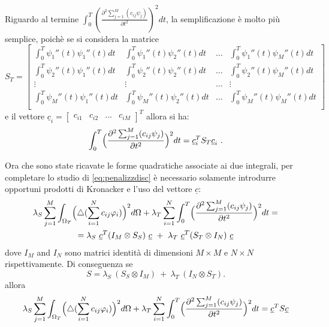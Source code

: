 \documentclass[a4paper,11pt,twoside,openright]{book}							%
\begin{document}
Riguardo al termine $\int_0^T (\frac{\partial^2 \sum_{j=1}^M(c_{ij}\psi_j) }{\partial t ^2} )^2 dt$, la semplificazione è molto più semplice, poichè se si considera la matrice
 $$ S_T = \begin{bmatrix}
\int_0^T \psi_1''(t) \psi_1''(t) dt  & \int_0^T \psi_1''(t) \psi_2''(t) dt & \hdots & \int_0^T \psi_1''(t) \psi_M''(t) dt  \\
\int_0^T \psi_2''(t) \psi_1''(t) dt  & \int_0^T \psi_2''(t) \psi_2''(t) dt & \hdots & \int_0^T \psi_2''(t) \psi_M''(t) dt  \\
\vdots & \vdots & \hdots & \vdots \\
\int_0^T \psi_M''(t) \psi_1''(t) dt  & \int_0^T \psi_M''(t) \psi_2''(t) dt & \hdots & \int_0^T \psi_M''(t) \psi_M''(t) dt  \\
\end{bmatrix} $$
e il vettore $
\underline c_i =
\begin{bmatrix}
c_{i1} & c_{i2} & \hdots & c_{iM}
\end{bmatrix}^T$ allora si ha:
$$
\int_0^T \Bigl( \frac{\partial^2 \sum_{j=1}^M(c_{ij}\psi_j) }{\partial t ^2} \Bigr)^2 dt =\underline c_i^T  S_T \underline c_i \ .
$$

Ora che sono state ricavate le forme quadratiche associate ai due integrali, per completare lo studio di \ref{eq:penalizzdisc} è necessario solamente introdurre opportuni prodotti di Kronacker e l'uso del vettore $\underline c$:
\begin{multline*}
\lambda_S  \sum_{j=1}^M \int_{\Omega_T} \Bigl( \triangle(\sum_{i=1}^N  c_{ij}\varphi_i ) \Bigr)^2 d \Omega + \lambda_T \sum_{i=1}^N\int_0^T \Bigl( \frac{\partial^2 \sum_{j=1}^M(c_{ij}\psi_j) }{\partial t ^2} \Bigr)^2 dt= \\
= \lambda_S\   \underline c^T (I_M \otimes S_S)\  \underline c   \ +\  \lambda_T\  \underline c^T ( S_T \otimes I_N)\  \underline c
\end{multline*}
dove $I_M$ and $I_N$ sono matrici identità di dimensioni $M \times M$ e $N \times N$ rispettivamente.
Di conseguenza se
$$ S = \lambda_S\    (S_S \otimes I_M)   \ +\  \lambda_T\   (I_N \otimes S_T)  .$$
allora
$$
\lambda_S  \sum_{j=1}^M \int_{\Omega_T} \Bigl( \triangle(\sum_{i=1}^N  c_{ij}\varphi_i ) \Bigr)^2 d \Omega + \lambda_T \sum_{i=1}^N\int_0^T \Bigl( \frac{\partial^2 \sum_{j=1}^M(c_{ij}\psi_j) }{\partial t ^2} \Bigr)^2 dt=\underline c^T S \underline c
$$
\end{document}
